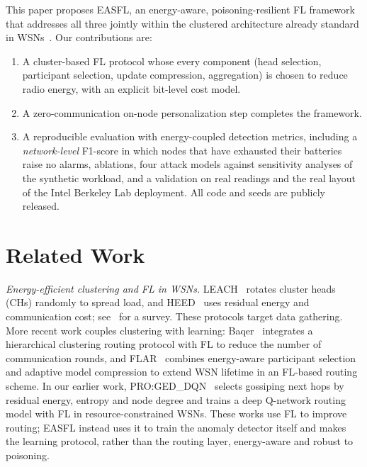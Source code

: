 \documentclass[journal]{IEEEtran}
\begin{document}
This paper proposes EASFL, an energy-aware, poisoning-resilient FL framework that addresses all three jointly within the clustered architecture already standard in WSNs~\cite{heinzelman2002,younis2004,abbasi2007}. Our contributions are:
\begin{enumerate}
\item A cluster-based FL protocol whose every component (head selection, participant selection, update compression, aggregation) is chosen to reduce radio energy, with an explicit bit-level cost model.
\item {} A zero-communication on-node personalization step completes the framework.
\item A reproducible evaluation with energy-coupled detection metrics, including a \emph{network-level} F1-score in which nodes that have exhausted their batteries raise no alarms, ablations, four attack models against  sensitivity analyses of the synthetic workload, and a validation on real readings and the real layout of the Intel Berkeley Lab deployment. All code and seeds are publicly released.
\end{enumerate}

\section{Related Work}
\textit{Energy-efficient clustering and FL in WSNs.} LEACH~\cite{heinzelman2002} rotates cluster heads (CHs) randomly to spread load, and HEED~\cite{younis2004} uses residual energy and communication cost; see~\cite{abbasi2007} for a survey. These protocols target data gathering. More recent work couples clustering with learning: Baqer~\cite{baqer2025} integrates a hierarchical clustering routing protocol with FL to reduce the number of communication rounds, and FLAR~\cite{hawkinson2025} combines energy-aware participant selection and adaptive model compression to extend WSN lifetime in an FL-based routing scheme. In our earlier work, PRO:GED\_DQN~\cite{shivakumar2026gossip} selects gossiping next hops by residual energy, entropy and node degree and trains a deep Q-network routing model with FL in resource-constrained WSNs. These works use FL to improve routing; EASFL instead uses it to train the anomaly detector itself and makes the learning protocol, rather than the routing layer, energy-aware and robust to poisoning.
\end{document}
